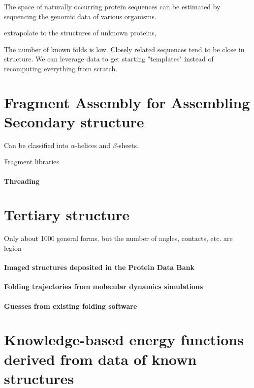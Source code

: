 \documentclass{article}
\begin{document}
The space of naturally occurring protein sequences can be estimated by sequencing the genomic data of various organisms. 

extrapolate to the structures of unknown proteins, 

The number of known folds is low. Closely related sequences tend to be close in structure. We can leverage data to get starting "templates" instead of recomputing everything from scratch.


\section{Fragment Assembly for Assembling Secondary structure}
Can be classified into $\alpha$-helices and $\beta$-sheets.

Fragment libraries

\paragraph{Threading}

\section{Tertiary structure}
Only about 1000 general forms, but the number of angles, contacts, etc. are legion

\paragraph{Imaged structures deposited in the Protein Data Bank}

\paragraph{Folding trajectories from molecular dynamics simulations}

\paragraph{Guesses from existing folding software}

\section{Knowledge-based energy functions derived from data of known structures}


\printbibliography
\end{document}
